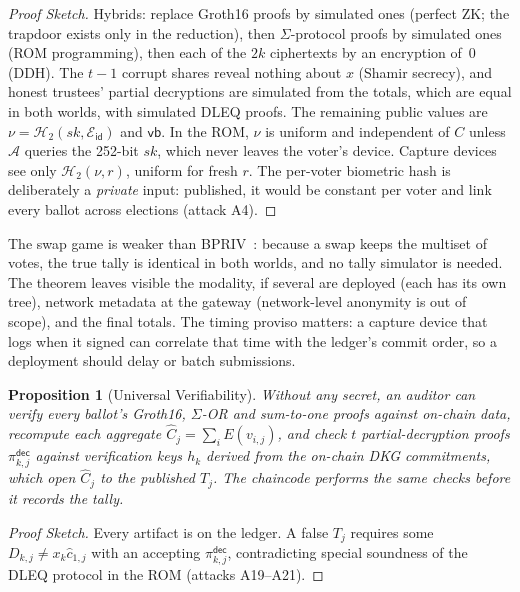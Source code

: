 \documentclass[10pt,letterpaper,journal]{IEEEtran}
\newtheorem{proposition}[theorem]{Proposition}
\begin{document}
\begin{proof}[Proof Sketch]
Hybrids: replace Groth16 proofs by simulated ones (perfect ZK; the trapdoor exists only in the reduction), then $\Sigma$-protocol proofs by simulated ones (ROM programming), then each of the $2k$ ciphertexts by an encryption of~0 (DDH). The $t-1$ corrupt shares reveal nothing about $x$ (Shamir secrecy), and honest trustees' partial decryptions are simulated from the totals, which are equal in both worlds, with simulated DLEQ proofs. The remaining public values are $\nu = \mathcal{H}_2(sk, \mathcal{E}_{\mathsf{id}})$ and $\mathsf{vb}$. In the ROM, $\nu$ is uniform and independent of $C$ unless $\mathcal{A}$ queries the 252-bit $sk$, which never leaves the voter's device. Capture devices see only $\mathcal{H}_2(\nu, r)$, uniform for fresh $r$. The per-voter biometric hash is deliberately a \emph{private} input: published, it would be constant per voter and link every ballot across elections (attack A4).
\end{proof}

The swap game is weaker than BPRIV~\cite{Bernhard2015}: because a swap keeps the multiset of votes, the true tally is identical in both worlds, and no tally simulator is needed. The theorem leaves visible the modality, if several are deployed (each has its own tree), network metadata at the gateway (network-level anonymity is out of scope), and the final totals. The timing proviso matters: a capture device that logs when it signed can correlate that time with the ledger's commit order, so a deployment should delay or batch submissions.

\begin{proposition}[Universal Verifiability]
\label{prop:verif}
Without any secret, an auditor can verify every ballot's Groth16, $\Sigma$-OR and sum-to-one proofs against on-chain data, recompute each aggregate $\hat{C}_j = \sum_i E(v_{i,j})$, and check $t$ partial-decryption proofs $\pi_{k,j}^{\mathsf{dec}}$ against verification keys $h_k$ derived from the on-chain DKG commitments, which open $\hat{C}_j$ to the published $T_j$. The chaincode performs the same checks before it records the tally.
\end{proposition}

\begin{proof}[Proof Sketch]
Every artifact is on the ledger. A false $T_j$ requires some $D_{k,j} \ne x_k \hat{c}_{1,j}$ with an accepting $\pi_{k,j}^{\mathsf{dec}}$, contradicting special soundness of the DLEQ protocol in the ROM (attacks A19--A21).
\end{proof}
\end{document}
